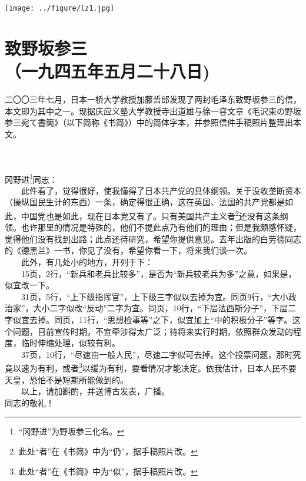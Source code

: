 \documentclass[cn,11pt,chinese]{elegantbook}
\def\myformat#1{\hfil\hfil #1}
\begin{document}
\begin{center}
 \texttt{[image: ../figure/lz1.jpg]} 
\end{center}
   


\newpage


\section*{\myformat{致野坂参三}\\\myformat{（一九四五年五月二十八日)}}
\begin{introduction}\item
二〇〇三年七月，日本一桥大学教授加藤哲郎发现了两封毛泽东致野坂参三的信，本文即为其中之一。现据庆应义塾大学教授寺出道雄与徐一睿文章《毛沢東の野坂参三宛て書簡》（以下简称《书简》）中的简体字本，并参照信件手稿照片整理出本文。
\end{introduction}\\~\\
冈野进\footnote[1]{“冈野进”为野坂参三化名。}同志：\\
　　此件看了，觉得很好，使我懂得了日本共产党的具体纲领。关于没收垄断资本（操纵国民生计的东西）一条，确定得很正确，这在英国、法国的共产党都是如此，中国党也是如此，现在日本党又有了。只有美国共产主义者\footnote[2]{此处“者”在《书简》中为“仍”，据手稿照片改。}还没有这条纲领。也许那里的情况是特殊的，他们不提此点乃有他们的理由；但是我颇感怀疑，觉得他们没有找到出路；此点还待研究，希望你提供意见。去年出版的白劳德同志的《德黑兰》一书，你见了没有，希望你看一下，将来我们谈一次。\\
　　此外，有几处小的地方，开列于下：\\
　　15页，2行，“新兵和老兵比较多”，是否为“新兵较老兵为多”之意，如果是，似宜改一下。\\
　　31页，5行，“上下级指挥官”，上下级三字似以去掉为宜。同页9行，“大小政治家”，大小二字似改“反动”二字为宜。同页，10行，“下层法西斯分子”，下层二字似宜去掉。同页，11行，“思想检事等”之下，似宜加上“中的积极分子”等字。这个问题，目前宣传时期，不宜牵涉得太广泛；待将来实行时期，依照群众发动的程度，临时伸缩处理，似较有利。\\
　　37页，10行，“尽速由一般人民”，尽速二字似可去掉。这个投票问题，那时究竟以速为有利，或者\footnote[3]{ 此处“者”在《书简》中为“似”，据手稿照片改。}以缓为有利，要看情况才能决定。依我估计，日本人民不要天皇，恐怕不是短期所能做到的。\\
　　以上，请加斟酌，并送博古发表，广播。\\
同志的敬礼！
\end{document}
